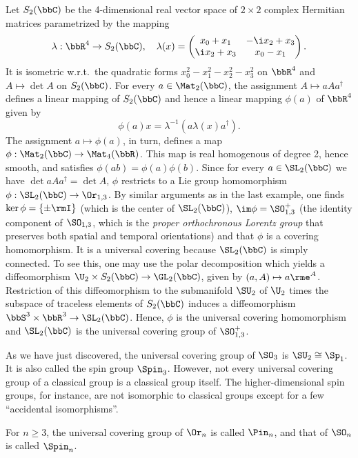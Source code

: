 \begin{example}\label{example so13 and sl2c}
    Let $S_2(\bbC)$ be the 4-dimensional real vector space of $2\times 2$ complex Hermitian matrices parametrized by the mapping
    \[\lambda:\bbR^4\to S_2(\bbC),\quad \lambda(x)=
    \begin{pmatrix}
        x_0+x_1&-\i x_2+x_3\\
        \i x_2+x_3&x_0-x_1
    \end{pmatrix}.
    \]
    It is isometric w.r.t.\ the quadratic forms $x_0^2-x_1^2-x_2^2-x_3^2$ on $\bbR^4$ and $A\mapsto \det A$ on $S_2(\bbC)$. For every $a\in\Mat_2(\bbC)$, the assignment $A\mapsto aAa^\dagger$ defines a linear mapping of $S_2(\bbC)$ and hence a linear mapping $\phi(a)$ of $\bbR^4$ given by
    \[\phi(a)x=\lambda^{-1}\left(a\lambda(x)a^\dagger\right).\]
    The assignment $a\mapsto \phi(a)$, in turn, defines a map $\phi:\Mat_2(\bbC)\to \Mat_4(\bbR)$. This map is real homogenous of degree 2, hence smooth, and satisfies $\phi(ab)=\phi(a)\phi(b)$. Since for every $a\in\SL_2(\bbC)$ we have $\det aAa^\dagger =\det A$, $\phi$ restricts to a Lie group homomorphism $\phi:\SL_2(\bbC)\to \Or_{1,3}$. By similar arguments as in the last example, one finds $\ker\phi=\{\pm \rmI\}$ (which is the center of $\SL_2(\bbC)$), $\im\phi=\SO^+_{1,3}$ (the identity component of $\SO_{1,3}$, which is the \emph{proper orthochronous Lorentz group} that preserves both spatial and temporal orientations) and that $\phi$ is a covering homomorphism. It is a universal covering because $\SL_2(\bbC)$ is simply connected. To see this, one may use the polar decomposition which yields a diffeomorphism $\U_2\times S_2(\bbC)\to \GL_2(\bbC)$, given by $(a,A)\mapsto a\rme^A$. Restriction of this diffeomorphism to the submanifold $\SU_2$ of $\U_2$ times the subspace of traceless elements of $S_2(\bbC)$ induces a diffeomorphism $\bbS^3\times \bbR^3\to \SL_2(\bbC)$. Hence, $\phi$ is the universal covering homomorphism and $\SL_2(\bbC)$ is the universal covering group of $\SO^+_{1,3}$.
\end{example}

As we have just discovered, the universal covering group of $\SO_3$ is $\SU_2\cong\Sp_1$. It is also called the spin group $\Spin_3$. However, not every universal covering group of a classical group is a classical group itself. The higher-dimensional spin groups, for instance, are not isomorphic to classical groups except for a few ``accidental isomorphisms''.

\begin{defn}
    For $n\geq 3$, the universal covering group of  $\Or_n$ is called $\Pin_n$, and that of $\SO_n$ is called $\Spin_n$.
\end{defn}

